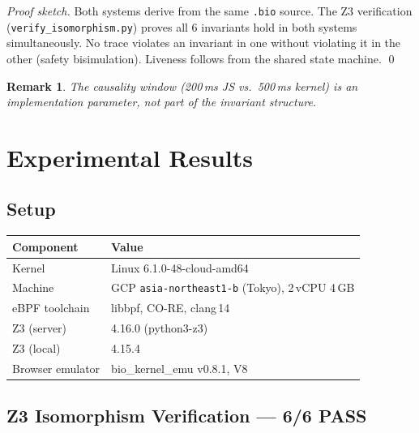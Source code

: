 \documentclass[11pt,a4paper,twoside]{article}
\newtheorem*{remark}{Remark}
\begin{document}
\begin{proof}[Proof sketch]
Both systems derive from the same \texttt{.bio} source. The Z3 verification
(\texttt{verify\_isomorphism.py}) proves all 6 invariants hold in both systems
simultaneously. No trace violates an invariant in one without violating it in the
other (safety bisimulation). Liveness follows from the shared state machine. \qed
\end{proof}

\begin{remark}
The causality window (200\,ms JS vs.\ 500\,ms kernel) is an implementation
parameter, not part of the invariant structure.
\end{remark}

\section{Experimental Results}

\subsection{Setup}

\begin{table}[H]
\centering
\begin{tabular}{@{}ll@{}}
\toprule
\textbf{Component} & \textbf{Value} \\ \midrule
Kernel             & Linux 6.1.0-48-cloud-amd64 \\
Machine            & GCP \texttt{asia-northeast1-b} (Tokyo), 2\,vCPU 4\,GB \\
eBPF toolchain     & libbpf, CO-RE, clang\,14 \\
Z3 (server)        & 4.16.0 (python3-z3) \\
Z3 (local)         & 4.15.4 \\
Browser emulator   & bio\_kernel\_emu v0.8.1, V8 \\
\bottomrule
\end{tabular}
\end{table}

\subsection{Z3 Isomorphism Verification --- 6/6 PASS}
\end{document}
